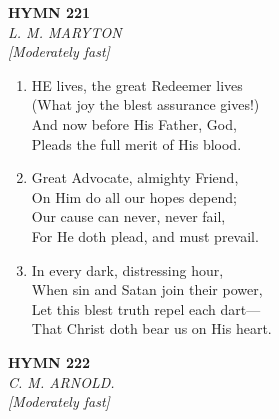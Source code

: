 \documentclass[11pt,a4paper]{article}
\begin{document}
\newpage
\begin{center}
    {\Large \textbf{HYMN 221}}
    \\
    \textit{L. M. MARYTON}
    \\
    \textit{\small [Moderately fast]}
\end{center}
\vspace{1em}

\begin{enumerate}
    \item HE lives, the great Redeemer lives \\
            (What joy the blest assurance gives!) \\
        And now before His Father, God, \\
            Pleads the full merit of His blood.

    \item Great Advocate, almighty Friend, \\
            On Him do all our hopes depend; \\
        Our cause can never, never fail, \\
            For He doth plead, and must prevail.

    \item In every dark, distressing hour, \\
            When sin and Satan join their power, \\
        Let this blest truth repel each dart--- \\
            That Christ doth bear us on His heart.

\end{enumerate}

\newpage
\begin{center}
    {\Large \textbf{HYMN 222}}
    \\
    \textit{C. M. ARNOLD.}
    \\
    \textit{\small [Moderately fast]}
\end{center}
\vspace{1em}
\end{document}
